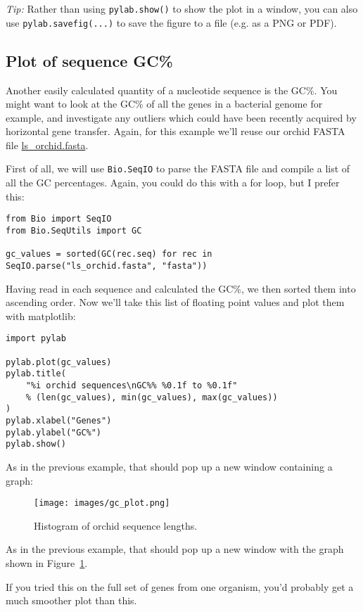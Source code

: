 \emph{Tip:} Rather than using \verb|pylab.show()| to show the plot in a window,
you can also use \verb|pylab.savefig(...)| to save the figure to a file
(e.g. as a PNG or PDF).

\subsection{Plot of sequence GC\%}

Another easily calculated quantity of a nucleotide sequence is the GC\%.  You might
want to look at the GC\% of all the genes in a bacterial genome for example, and
investigate any outliers which could have been recently acquired by horizontal gene
transfer.  Again, for this example we'll reuse our orchid FASTA file
\href{https://raw.githubusercontent.com/biopython/biopython/master/Doc/examples/ls_orchid.fasta}{ls\_orchid.fasta}.

First of all, we will use \verb|Bio.SeqIO| to parse the FASTA file and compile a list
of all the GC percentages.  Again, you could do this with a for loop, but I prefer this:

\begin{verbatim}
from Bio import SeqIO
from Bio.SeqUtils import GC

gc_values = sorted(GC(rec.seq) for rec in SeqIO.parse("ls_orchid.fasta", "fasta"))
\end{verbatim}

Having read in each sequence and calculated the GC\%, we then sorted them into ascending
order. Now we'll take this list of floating point values and plot them with matplotlib:

\begin{verbatim}
import pylab

pylab.plot(gc_values)
pylab.title(
    "%i orchid sequences\nGC%% %0.1f to %0.1f"
    % (len(gc_values), min(gc_values), max(gc_values))
)
pylab.xlabel("Genes")
pylab.ylabel("GC%")
pylab.show()
\end{verbatim}

%
%
\begin{htmlonly}
\noindent As in the previous example, that should pop up a new window containing a graph:


\end{htmlonly}
%
%
\begin{latexonly}
\begin{figure}[htbp]
\centering
\texttt{[image: images/gc\_plot.png]}
\caption{Histogram of orchid sequence lengths.}
\label{fig:seq-gc-plot}
\end{figure}
\noindent As in the previous example, that should pop up a new window with the graph shown in Figure~\ref{fig:seq-gc-plot}.
\end{latexonly}
%
%
If you tried this on the full set of genes from one organism, you'd probably get a much
smoother plot than this.

